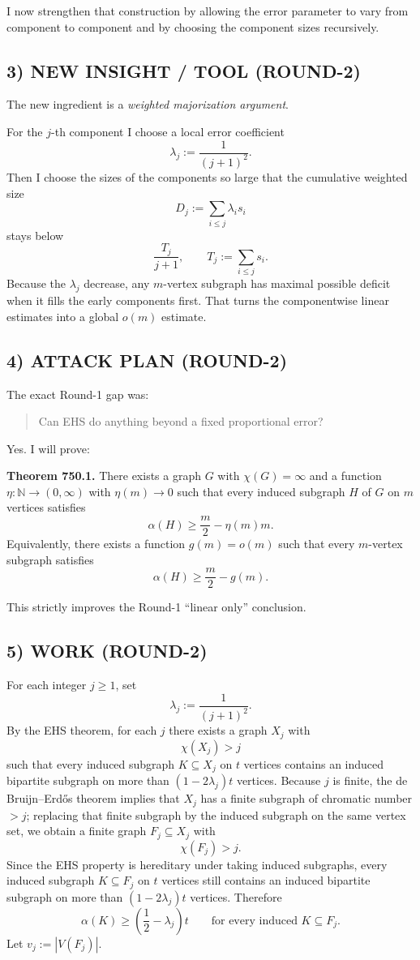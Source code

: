 I now strengthen that construction by allowing the error parameter to vary from component to component and by choosing the component sizes recursively.

\subsection*{3) NEW INSIGHT / TOOL (ROUND-2)}

The new ingredient is a \emph{weighted majorization argument}.

For the $j$-th component I choose a local error coefficient
\[
\lambda_j:=\frac{1}{(j+1)^2}.
\]
Then I choose the sizes of the components so large that the cumulative weighted size
\[
D_j:=\sum_{i\le j}\lambda_i s_i
\]
stays below
\[
\frac{T_j}{j+1},
\qquad
T_j:=\sum_{i\le j}s_i.
\]
Because the $\lambda_j$ decrease, any $m$-vertex subgraph has maximal possible deficit when it fills the early components first.
That turns the componentwise linear estimates into a global $o(m)$ estimate.

\subsection*{4) ATTACK PLAN (ROUND-2)}

The exact Round-1 gap was:
\begin{quote}
Can EHS do anything beyond a fixed proportional error?
\end{quote}

Yes. I will prove:

\medskip
\noindent
\textbf{Theorem 750.1.}
There exists a graph $G$ with $\chi(G)=\infty$ and a function $\eta:\mathbb N\to(0,\infty)$ with $\eta(m)\to 0$ such that every induced subgraph $H$ of $G$ on $m$ vertices satisfies
\[
\alpha(H)\ge \frac m2-\eta(m)m.
\]
Equivalently, there exists a function $g(m)=o(m)$ such that every $m$-vertex subgraph satisfies
\[
\alpha(H)\ge \frac m2-g(m).
\]

This strictly improves the Round-1 ``linear only'' conclusion.

\subsection*{5) WORK (ROUND-2)}

For each integer $j\ge 1$, set
\[
\lambda_j:=\frac{1}{(j+1)^2}.
\]
By the EHS theorem, for each $j$ there exists a graph $X_j$ with
\[
\chi(X_j)>j
\]
such that every induced subgraph $K\subseteq X_j$ on $t$ vertices contains an induced bipartite subgraph on more than $(1-2\lambda_j)t$ vertices.
Because $j$ is finite, the de Bruijn--Erd\H{o}s theorem implies that $X_j$ has a finite subgraph of chromatic number $>j$; replacing that finite subgraph by the induced subgraph on the same vertex set, we obtain a finite graph $F_j\subseteq X_j$ with
\[
\chi(F_j)>j.
\]
Since the EHS property is hereditary under taking induced subgraphs, every induced subgraph $K\subseteq F_j$ on $t$ vertices still contains an induced bipartite subgraph on more than $(1-2\lambda_j)t$ vertices.
Therefore
\[
\alpha(K)\ge \left(\frac12-\lambda_j\right)t
\qquad\text{for every induced }K\subseteq F_j.
\]
Let $v_j:=|V(F_j)|$.

